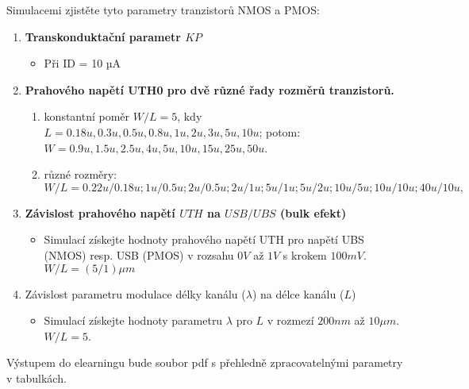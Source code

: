 Simulacemi zjistěte tyto parametry tranzistorů NMOS a PMOS:

\begin{enumerate}
    \item {\bf Transkonduktační parametr \(KP\)}
    \begin{itemize}
        \item Při ID = 10 µA
    \end{itemize}
    \item {\bf Prahového napětí UTH0 pro dvě různé řady rozměrů tranzistorů.}
    \begin{enumerate}
        \item konstantní poměr \(W/L = 5\), kdy 
            \(L = 0.18u, 0.3u, 0.5u, 0.8u, 1u, 2u, 3u, 5u, 10u\); potom:
            \(W = 0.9u, 1.5u, 2.5u, 4u, 5u, 10u, 15u, 25u, 50u\).
        \item různé rozměry: \(W/L = 0.22u/0.18u; 1u/0.5u; 2u/0.5u; 2u/1u; 5u/1u; 5u/2u; 10u/5u; 10u/10u; 40u/10u,\)
    \end{enumerate}
    \item {\bf Závislost prahového napětí \(UTH\) na \(USB/UBS\) (bulk efekt)}
    \begin{itemize}
        \item Simulací získejte hodnoty prahového napětí UTH pro napětí UBS (NMOS) resp. USB (PMOS) v rozsahu \(0 V\) až \(1 V\) s krokem \(100 mV.\) \(W/L = (5/1) \mu m\)
    \end{itemize}
    \item Závislost parametru modulace délky kanálu (\(\lambda\)) na délce kanálu (\(L\))
    \begin{itemize}
        \item Simulací získejte hodnoty parametru \(\lambda\) pro \(L\) v rozmezí \(200 nm\) až \(10 \mu m\). \(W/L = 5\).
    \end{itemize}
\end{enumerate}

Výstupem do elearningu bude soubor pdf s přehledně zpracovatelnými parametry v tabulkách. 
